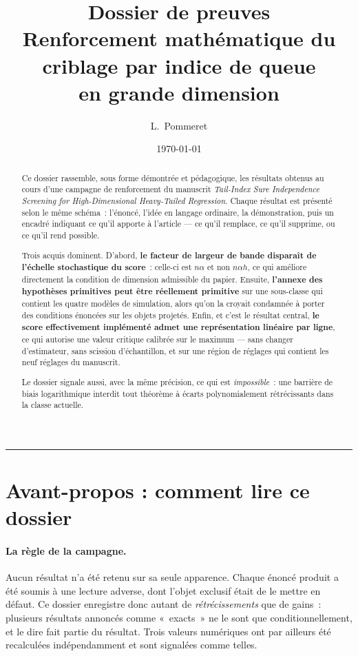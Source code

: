 \documentclass[11pt]{article}
\title{\bfseries Dossier de preuves\\[4pt]
\large Renforcement mathématique du criblage par indice de queue\\
\large en grande dimension}
\author{L.~Pommeret}
\date{\today}
\theoremstyle{plain}
\theoremstyle{definition}
\theoremstyle{remark}
\newcommand{\1}{\mathbf 1}
\begin{document}
\maketitle

\begin{abstract}
\noindent
Ce dossier rassemble, sous forme démontrée et pédagogique, les résultats
obtenus au cours d'une campagne de renforcement du manuscrit
\emph{Tail-Index Sure Independence Screening for High-Dimensional
Heavy-Tailed Regression}. Chaque résultat est présenté selon le même
schéma~: l'énoncé, l'idée en langage ordinaire, la démonstration, puis
un encadré indiquant ce qu'il apporte à l'article --- ce qu'il remplace,
ce qu'il supprime, ou ce qu'il rend possible.

\smallskip\noindent
Trois acquis dominent. D'abord, \textbf{le facteur de largeur de bande
disparaît de l'échelle stochastique du score}~: celle-ci est $n\alpha$ et
non $n\alpha h$, ce qui améliore directement la condition de dimension
admissible du papier. Ensuite, \textbf{l'annexe des hypothèses primitives
peut être réellement primitive} sur une sous-classe qui contient les
quatre modèles de simulation, alors qu'on la croyait condamnée à porter
des conditions énoncées sur les objets projetés. Enfin, et c'est le
résultat central, \textbf{le score effectivement implémenté admet une
représentation linéaire par ligne}, ce qui autorise une valeur critique
calibrée sur le maximum --- sans changer d'estimateur, sans scission
d'échantillon, et sur une région de réglages qui contient les neuf
réglages du manuscrit.

\smallskip\noindent
Le dossier signale aussi, avec la même précision, ce qui est
\emph{impossible}~: une barrière de biais logarithmique interdit tout
théorème à écarts polynomialement rétrécissants dans la classe actuelle.
\end{abstract}

\tableofcontents

\bigskip
\hrule
\bigskip

\section*{Avant-propos : comment lire ce dossier}

\paragraph{La règle de la campagne.} Aucun résultat n'a été retenu sur sa
seule apparence. Chaque énoncé produit a été soumis à une lecture
adverse, dont l'objet exclusif était de le mettre en défaut. Ce dossier
enregistre donc autant de \emph{rétrécissements} que de gains~: plusieurs
résultats annoncés comme «~exacts~» ne le sont que
conditionnellement, et le dire fait partie du résultat. Trois valeurs
numériques ont par ailleurs été recalculées indépendamment et sont
signalées comme telles.
\end{document}
